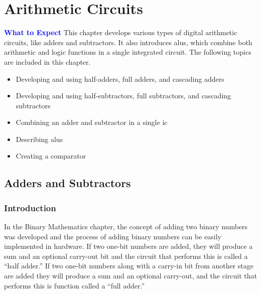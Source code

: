 \chapter{Arithmetic Circuits}\label{ch08}

\begin{tcolorbox}[colback=blue!5!white,colframe=blue!75!black]
	\textcolor{blue}{\textbf{What to Expect}}
	\tcblower
	This chapter develops various types of digital arithmetic circuits, like adders and subtractors. It also introduces \glspl{alu}, which combine both arithmetic and logic functions in a single integrated circuit. The following topics are included in this chapter.

	\begin{itemize}
		\item Developing and using half-adders, full adders, and cascading adders
		\item Developing and using half-subtractors, full subtractors, and cascading subtractors
		\item Combining an adder and subtractor in a single \gls{ic}
		\item Describing \glspl{alu}
		\item Creating a comparator
	\end{itemize}

\end{tcolorbox}

\section{Adders and Subtractors}
\label{CL:sec:adders_and_subtractors}

\subsection{Introduction}
\label{CL:subsec:introduction_to_adders_and_subtractors}

In the Binary Mathematics chapter, the concept of adding two binary numbers was developed and the process of adding binary numbers can be easily implemented in hardware. If two one-bit numbers are added, they will produce a sum and an optional carry-out bit and the circuit that performs this is called a ``half adder.'' If two one-bit numbers along with a carry-in bit from another stage are added they will produce a sum and an optional carry-out, and the circuit that performs this is function called a ``full adder.'' 

